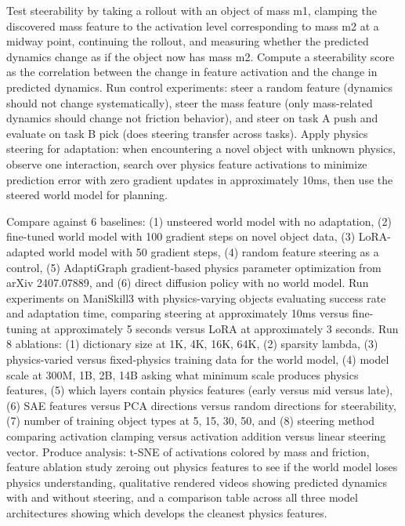 \documentclass[11pt,a4paper]{article}
\begin{document}
Test steerability by taking a rollout with an object of mass m1, clamping the discovered mass feature to the activation level corresponding to mass m2 at a midway point, continuing the rollout, and measuring whether the predicted dynamics change as if the object now has mass m2. Compute a steerability score as the correlation between the change in feature activation and the change in predicted dynamics. Run control experiments: steer a random feature (dynamics should not change systematically), steer the mass feature (only mass-related dynamics should change not friction behavior), and steer on task A push and evaluate on task B pick (does steering transfer across tasks). Apply physics steering for adaptation: when encountering a novel object with unknown physics, observe one interaction, search over physics feature activations to minimize prediction error with zero gradient updates in approximately 10ms, then use the steered world model for planning.

Compare against 6 baselines: (1) unsteered world model with no adaptation, (2) fine-tuned world model with 100 gradient steps on novel object data, (3) LoRA-adapted world model with 50 gradient steps, (4) random feature steering as a control, (5) AdaptiGraph gradient-based physics parameter optimization from arXiv 2407.07889, and (6) direct diffusion policy with no world model. Run experiments on ManiSkill3 with physics-varying objects evaluating success rate and adaptation time, comparing steering at approximately 10ms versus fine-tuning at approximately 5 seconds versus LoRA at approximately 3 seconds. Run 8 ablations: (1) dictionary size at 1K, 4K, 16K, 64K, (2) sparsity lambda, (3) physics-varied versus fixed-physics training data for the world model, (4) model scale at 300M, 1B, 2B, 14B asking what minimum scale produces physics features, (5) which layers contain physics features (early versus mid versus late), (6) SAE features versus PCA directions versus random directions for steerability, (7) number of training object types at 5, 15, 30, 50, and (8) steering method comparing activation clamping versus activation addition versus linear steering vector. Produce analysis: t-SNE of activations colored by mass and friction, feature ablation study zeroing out physics features to see if the world model loses physics understanding, qualitative rendered videos showing predicted dynamics with and without steering, and a comparison table across all three model architectures showing which develops the cleanest physics features.

\end{document}
